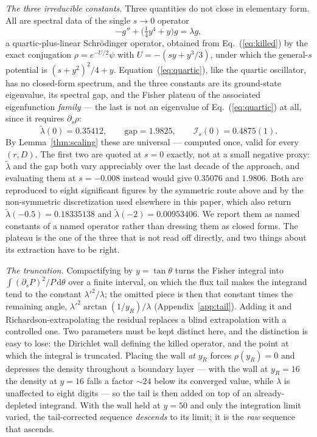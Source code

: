 \documentclass[%
 aip,
 cha,
 amsmath,amssymb,
 reprint,
 superscriptaddress,
 floatfix,
]{revtex4-2}
\newcommand{\dd}{\mathrm{d}}
\newcommand{\Ifish}{\mathcal{I}}
\begin{document}
\emph{The three irreducible constants.}  Three quantities do not close in elementary form.  All are spectral data of the single $s\to0$ operator
\begin{equation}
\label{eq:quartic}
-g''+\bigl(\tfrac14y^4+y\bigr)g=\lambda g,
\end{equation}
a quartic-plus-linear Schr\"odinger operator, obtained from Eq.~(\ref{eq:killed}) by the exact conjugation $\rho=e^{-U/2}\psi$ with $U=-(sy+y^3/3)$, under which the general-$s$ potential is $(s+y^2)^2/4+y$.  Equation~(\ref{eq:quartic}), like the quartic oscillator, has no closed-form spectrum, and the three constants are its ground-state eigenvalue, its spectral gap, and the Fisher plateau of the associated eigenfunction \emph{family} --- the last is not an eigenvalue of Eq.~(\ref{eq:quartic}) at all, since it requires $\partial_s\rho$:
\begin{equation}
\label{eq:constants}
\tilde\lambda(0)=0.35412,\qquad
\text{gap}=1.9825,\qquad
\Ifish_s(0)=0.4875(1).
\end{equation}
By Lemma~\ref{thm:scaling} these are universal --- computed once, valid for every $(r,D)$.  The first two are quoted at $s=0$ exactly, not at a small negative proxy: $\tilde\lambda$ and the gap both vary appreciably over the last decade of the approach, and evaluating them at $s=-0.008$ instead would give $0.35076$ and $1.9806$.  Both are reproduced to eight significant figures by the symmetric route above and by the non-symmetric discretization used elsewhere in this paper, which also return $\tilde\lambda(-0.5)=0.18335138$ and $\tilde\lambda(-2)=0.00953406$.  We report them as named constants of a named operator rather than dressing them as closed forms.  The plateau is the one of the three that is not read off directly, and two things about its extraction have to be right.

\emph{The truncation.}  Compactifying by $y=\tan\theta$ turns the Fisher integral into $\int(\partial_sP)^2/P\,\dd\theta$ over a finite interval, on which the flux tail makes the integrand tend to the constant $\lambda'^2/\lambda$; the omitted piece is then that constant times the remaining angle, $\lambda'^2\arctan(1/y_R)/\lambda$ (Appendix~\ref{app:tail}).  Adding it and Richardson-extrapolating the residual replaces a blind extrapolation with a controlled one.  Two parameters must be kept distinct here, and the distinction is easy to lose: the Dirichlet wall defining the killed operator, and the point at which the integral is truncated.  Placing the wall \emph{at} $y_R$ forces $\rho(y_R)=0$ and depresses the density throughout a boundary layer --- with the wall at $y_R=16$ the density at $y=16$ falls a factor ${\sim}24$ below its converged value, while $\lambda$ is unaffected to eight digits --- so the tail is then added on top of an already-depleted integrand.  With the wall held at $y=50$ and only the integration limit varied, the tail-corrected sequence \emph{descends} to its limit; it is the \emph{raw} sequence that ascends.
\end{document}
